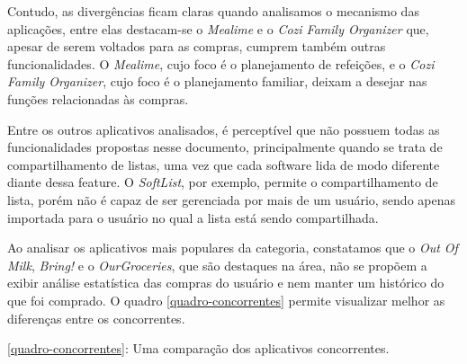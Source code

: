 Contudo, as divergências ficam claras quando analisamos o mecanismo das aplicações, entre elas destacam-se o \textit{Mealime} e o \textit{Cozi Family Organizer} que, apesar de serem voltados para as compras, cumprem também outras funcionalidades. O \textit{Mealime}, cujo foco é o planejamento de refeições, e o \textit{Cozi Family Organizer}, cujo foco é o planejamento familiar, deixam a desejar nas funções relacionadas às compras.

Entre os outros aplicativos analisados, é perceptível que não possuem todas as funcionalidades propostas nesse documento, principalmente quando se trata de compartilhamento de listas, uma vez que cada software lida de modo diferente diante dessa feature. O \textit{SoftList}, por exemplo, permite o compartilhamento de lista, porém não é capaz de ser gerenciada por mais de um usuário, sendo apenas importada para o usuário no qual a lista está sendo compartilhada.

Ao analisar os aplicativos mais populares da categoria, constatamos que o \textit{Out Of Milk}, \textit{Bring!} e o \textit{OurGroceries}, que são destaques na área, não se propõem a exibir análise estatística das compras do usuário e nem manter um histórico do que foi comprado. O quadro \ref{quadro-concorrentes} permite visualizar melhor as diferenças entre os concorrentes.

\label{quadro-concorrentes}
\begin{quadro}[h]
\centering
\caption{\ref{quadro-concorrentes}: Uma comparação dos aplicativos concorrentes.}      
\end{quadro}
